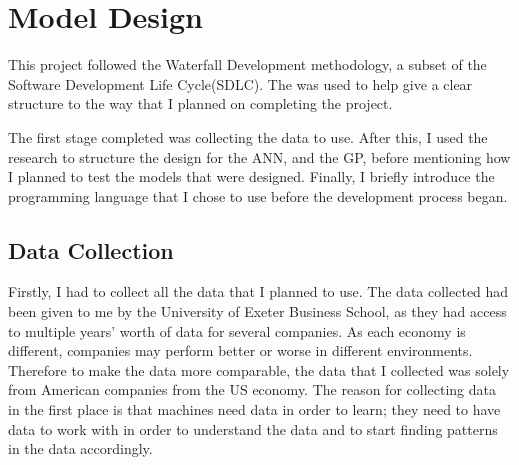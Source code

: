 \documentclass[11pt]{article}
\begin{document}
\section{Model Design}\label{sec:design}
This project followed the Waterfall Development methodology, a subset of the Software Development Life Cycle(SDLC). The was used to help give a clear structure to the way that I planned on completing the project. 

The first stage completed was collecting the data to use. After this, I used the research to structure the design for the ANN, and the GP, before mentioning how I planned to test the models that were designed. Finally, I briefly introduce the programming language that I chose to use before the development process began.
\subsection{Data Collection}\label{subsec:dataColl}
Firstly, I had to collect all the data that I planned to use. The data collected had been given to me by the University of Exeter Business School, as they had access to multiple years' worth of data for several companies. As each economy is different, companies may perform better or worse in different environments. Therefore to make the data more comparable, the data that I collected was solely from American companies from the US economy. The reason for collecting data in the first place is that machines need data in order to learn; they need to have data to work with in order to understand the data and to start finding patterns in the data accordingly.
\end{document}

